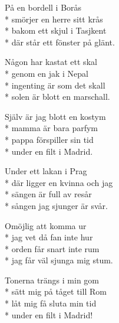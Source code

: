 \begin{SongText}
\begin{SongVerse}
        På en bordell i Borås\\*%
        smörjer en herre sitt krås\\*%
        bakom ett skjul i Tasjkent\\*%
        där står ett fönster på glänt.
    \end{SongVerse}
    \begin{SongVerse}
        Någon har kastat ett skal\\*%
        genom en jak i Nepal\\*%
        ingenting är som det skall\\*%
        solen är blott en marschall.
    \end{SongVerse}
    \begin{SongVerse}
        Själv är jag blott en kostym\\*%
        mamma är bara parfym\\*%
        pappa förspiller sin tid\\*%
        under en filt i Madrid.
    \end{SongVerse}
    \begin{SongVerse}
        Under ett lakan i Prag\\*%
        där ligger en kvinna och jag\\*%
        sängen är full av resår\\*%
        sången jag sjunger är svår.
    \end{SongVerse}
    \begin{SongVerse}
        Omöjlig att komma ur\\*%
        jag vet då fan inte hur\\*%
        orden får snart inte rum\\*%
        jag får väl sjunga mig stum.
    \end{SongVerse}
    \begin{SongVerse}
        Tonerna trängs i min gom\\*%
        sätt mig på tåget till Rom\\*%
        låt mig få sluta min tid\\*%
        under en filt i Madrid!
    \end{SongVerse}
\end{SongText}
